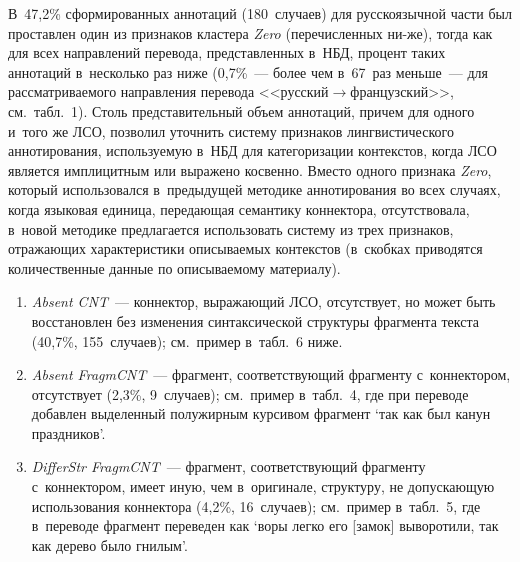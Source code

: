 \begin{multicols}{2}
   В~47,2\% сформированных аннотаций (180~случаев) для русскоязычной 
части был проставлен один из признаков кластера \textit{Zero} 
(перечисленных ни-\linebreak же), тогда как для всех направлений перевода, 
представ\-лен\-ных в~НБД, процент таких аннотаций в~несколько раз ниже 
(0,7\%~--- более чем в~67~раз меньше~--- для рассматриваемого на\-прав\-ле\-ния 
перевода <<рус\-ский\;$\to$\;фран\-цуз\-ский>>, см.\ табл.~1). Столь 
представительный объем аннотаций, причем для одного и~того же ЛСО, 
позволил уточнить систему признаков лингвистического аннотирования, 
используемую в~НБД для категоризации контекстов, когда ЛСО является 
имплицитным или выражено косвенно. Вместо одного признака \textit{Zero}, 
который использовался в~предыдущей методике аннотирования во всех 
случаях, когда языковая единица, передающая семантику коннектора, 
отсутствовала, в~новой методике предлагается использовать систему из трех 
признаков, отражающих характеристики описываемых контекстов 
(в~скобках приводятся количественные данные по описываемому 
материалу).
   \begin{enumerate}[1.]
\item \textit{Absent CNT}~--- коннектор, выражающий ЛСО, отсутствует, но 
может быть восстановлен без изменения синтаксической структуры 
фрагмента текста (40,7\%, 155~случаев); см.\ пример в~табл.~6 ниже.
\item \textit{Absent FragmCNT}~--- фрагмент, со\-от\-вет\-ст\-ву\-ющий фрагменту 
с~коннектором, отсутствует (2,3\%, 9~случаев); см.\ пример в~табл.~4, где 
при переводе добавлен выделенный полужирным курсивом фрагмент `так 
как был канун праздников'.


\item \textit{DifferStr FragmCNT}~--- фрагмент, соответст\-ву\-ющий фрагменту с~коннектором, имеет иную, чем в~оригинале, структуру, не допускающую 
использования коннектора (4,2\%, 16~случаев); см.\ пример в~табл.~5, где 
в~переводе фрагмент переведен как `воры легко его [замок] выворотили, так 
как дерево было гнилым'.
\end{enumerate}

\begin{table*}\small %
\begin{center}
\vspace*{2ex}


\end{center}
\end{table*}
\end{multicols}
